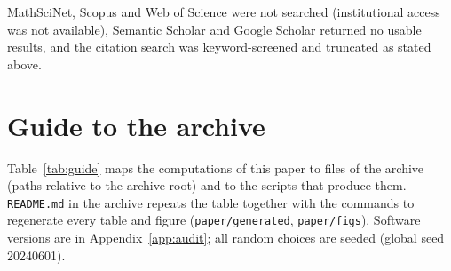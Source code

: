 \documentclass[10pt]{article}
\theoremstyle{definition}
\theoremstyle{plain}
\theoremstyle{remark}
\begin{document}
\noindent MathSciNet, Scopus and Web of Science were not searched (institutional access was not available), Semantic Scholar and Google Scholar returned no usable results, and the citation search was keyword-screened and truncated as stated above.

\section{Guide to the archive}\label{app:guide}
Table~\ref{tab:guide} maps the computations of this paper to files of the archive (paths relative to the archive root) and to the scripts that produce them. \texttt{README.md} in the archive repeats the table together with the commands to regenerate every table and figure (\texttt{paper/generated}, \texttt{paper/figs}). Software versions are in Appendix~\ref{app:audit}; all random choices are seeded (global seed 20240601).
\end{document}
